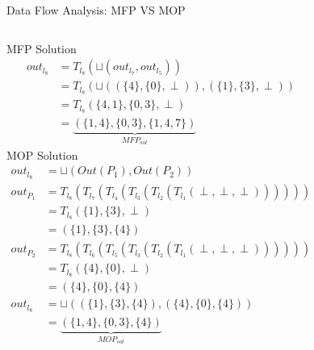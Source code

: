 \begin{frame}{Data Flow Analysis: MFP VS MOP}
\begin{columns}
    
	
	\tiny

    MFP Solution
	\begin{subequations}
			\begin{align}
			out_{l_8} &= T_{l_8}(\sqcup(out_{l_7}, out_{l_5}))\\
			&= T_{l_8}(\sqcup((\{4\},\{0\},\perp)),(\{1\},\{3\},\perp))\\
			&= T_{l_8}(\{4,1\},\{0,3\},\perp)\\
			&= \underbrace{(\{1,4\},\{0,3\},\{1,4,7\})}_{MFP_{sol}}
			\end{align}
		\end{subequations}
	MOP Solution 
	\begin{subequations}
		\begin{align}
		out_{l_8} &=\sqcup( Out(P_1), Out(P_2))\\	
		out_{P_1}  &= T_{l_8}(T_{l_7}(T_{l_4}(T_{l_3}(T_{l_2}(T_{l_1}(\perp,\perp,\perp))))))\\
		&=T_{l_8}(\{1\},\{3\},\perp)\\
		&= (\{1\},\{3\},\{4\})\\
		out_{P_2}  &= T_{l_8}(T_{l_6}(T_{l_5}(T_{l_3}(T_{l_2}(T_{l_1}(\perp,\perp,\perp))))))\\
		&=T_{l_8}(\{4\},\{0\},\perp)\\
		&=(\{4\},\{0\},\{4\})\\
		out_{l_8} &=\sqcup( (\{1\},\{3\},\{4\}),(\{4\},\{0\},\{4\}))\\
		&= \underbrace{(\{1,4\},\{0,3\},\{4\})}_{MOP_{sol}}
		\end{align}

	
	\end{subequations}
	                
	              
\end{columns}
\end{frame}

